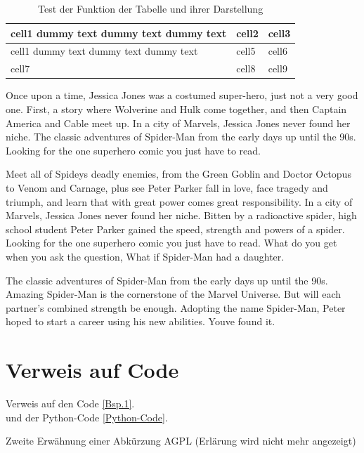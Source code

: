\begin{table}[h!]
\centering
\begin{tabular}{ | m{5cm} | m{1cm}| m{1cm} | } 
\hline
cell1 dummy text dummy text dummy text& cell2 & cell3 \\ 
\hline
cell1 dummy text dummy text dummy text & cell5 & cell6 \\ 
\hline
cell7 & cell8 & cell9 \\ 
\hline
\end{tabular}
\caption{Test der Funktion der Tabelle und ihrer Darstellung}
\label{tabelle1}
\end{table}


Once upon a time, Jessica Jones was a costumed super-hero, just not a very good one. First, a story where Wolverine and Hulk come together, and then Captain America and Cable meet up. In a city of Marvels, Jessica Jones never found her niche. The classic adventures of Spider-Man from the early days up until the 90s. Looking for the one superhero comic you just have to read.

Meet all of Spideys deadly enemies, from the Green Goblin and Doctor Octopus to Venom and Carnage, plus see Peter Parker fall in love, face tragedy and triumph, and learn that with great power comes great responsibility. In a city of Marvels, Jessica Jones never found her niche. Bitten by a radioactive spider, high school student Peter Parker gained the speed, strength and powers of a spider. Looking for the one superhero comic you just have to read. What do you get when you ask the question, What if Spider-Man had a daughter.

The classic adventures of Spider-Man from the early days up until the 90s. Amazing Spider-Man is the cornerstone of the Marvel Universe. But will each partner’s combined strength be enough. Adopting the name Spider-Man, Peter hoped to start a career using his new abilities. Youve found it.

\section{Verweis auf Code}
Verweis auf den Code \autoref{Bsp.1}.\\
und der Python-Code \autoref{Python-Code}.

Zweite Erwähnung einer Abkürzung \ac{AGPL} (Erlärung wird nicht mehr angezeigt)